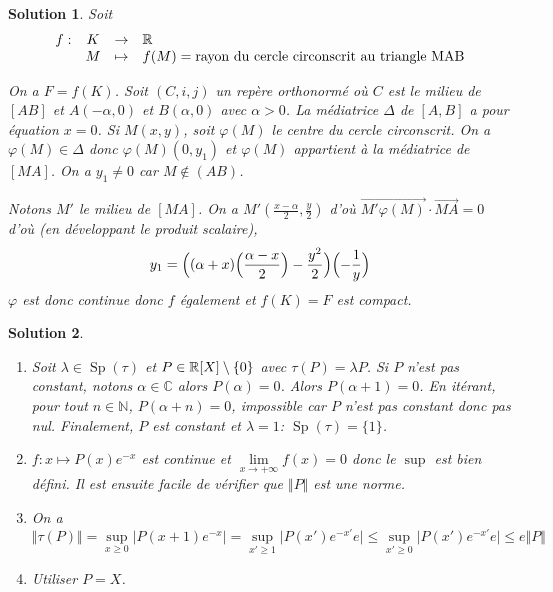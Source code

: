 \documentclass[12pt]{article}
\newtheorem{solution}{Solution}[section]
\theoremstyle{remark}
\newcommand{\C}{\mathbb{C}} \newcommand{\Q}{\mathbb{Q}}
\newcommand{\N}{\mathbb{N}} \newcommand{\Z}{\mathbb{Z}}
\DeclareMathOperator{\Sp}{Sp} \DeclareMathOperator{\mat}{mat}
\newcommand{\function}[5]{
	$$
	\begin{array}{rccl}
		#1: & #2 & \to & #3 \\
		& #4 & \mapsto & #5
	\end{array}
	$$
}
\begin{document}
\begin{solution}
	Soit \function{f}{K}{\R}{M}{f(M)=\text{rayon du cercle circonscrit au triangle MAB}}
	On a $F=f(K)$. Soit $(C,i,j)$ un repère orthonormé où $C$ est le milieu de $[AB]$ et $A(-\alpha,0)$ et $B(\alpha,0)$ avec $\alpha>0$. La médiatrice $\Delta$ de $[A,B]$ a pour équation $x=0$. Si $M(x,y)$, soit $\varphi(M)$ le centre du cercle circonscrit. On a $\varphi(M)\in\Delta$ donc $\varphi(M)(0,y_{1})$ et $\varphi(M)$ appartient à la médiatrice de $[MA]$. On a $y_{1}\neq0$ car $M\notin(AB)$.

	Notons $M'$ le milieu de $[MA]$. On a $M'(\frac{x-\alpha}{2},\frac{y}{2})$ d'où $\vec{M'\varphi(M)}\cdot\vec{MA}=0$ d'où (en développant le produit scalaire),
	$$y_{1}=\Bigl((\alpha+x)\Bigl(\frac{\alpha-x}{2}\Bigr)-\frac{y^{2}}{2}\Bigr)\Bigl(-\frac{1}{y}\Bigr)$$
	$\varphi$ est donc continue donc $f$ également et $f(K)=F$ est compact.
\end{solution}

\begin{solution}
	\phantom{}
	\begin{enumerate}
		\item Soit $\lambda\in\Sp(\tau)$ et $P\in\mathbb{R}[X]\setminus\{0\}$ avec $\tau(P)=\lambda P$. Si $P$ n'est pas constant, notons $\alpha\in\C$ alors $P(\alpha)=0$. Alors $P(\alpha+1)=0$. En itérant, pour tout $n\in\N$, $P(\alpha+n)=0$, impossible car $P$ n'est pas constant donc pas nul. Finalement, $P$ est constant et $\lambda=1$: $\Sp(\tau)=\{1\}$.
		\item $f\colon x\mapsto P(x)e^{-x}$ est continue et $\lim\limits_{x\to+\infty}f(x)=0$ donc le $\sup$ est bien défini. Il est ensuite facile de vérifier que $\Vert P\Vert$ est une norme.
		\item On a 
		$$\Vert\tau(P)\Vert=\sup\limits_{x\geqslant0}\vert P(x+1)e^{-x}\vert=\sup\limits_{x'\geqslant1}\vert P(x')e^{-x'}e\vert\leqslant\sup\limits_{x'\geqslant0}\vert P(x')e^{-x'}e\vert\leqslant e\Vert P\Vert$$
		\item Utiliser $P=X$.
	\end{enumerate}
\end{solution}
\end{document}
